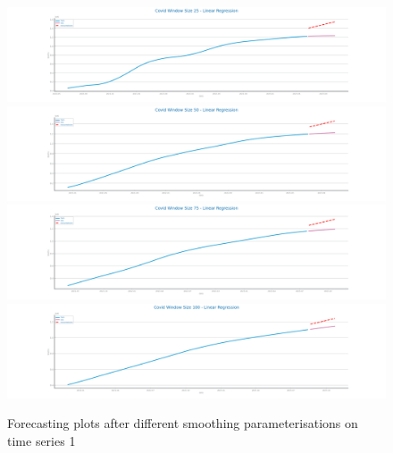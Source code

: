 \documentclass[10pt]{extarticle}
\begin{document}
\begin{figure}[H]
\centering\includegraphics[scale=0.4]{images/dataset1/time_series/Covid Window Size 25 - Linear Regression_forecasting_series.png}
\includegraphics[scale=0.4]{images/dataset1/time_series/Covid Window Size 50 - Linear Regression_forecasting_series.png}
\includegraphics[scale=0.4]{images/dataset1/time_series/Covid Window Size 75 - Linear Regression_forecasting_series.png}
\includegraphics[scale=0.4]{images/dataset1/time_series/Covid Window Size 100 - Linear Regression_forecasting_series.png}
\caption{Forecasting plots after different smoothing parameterisations on time series 1}
\end{figure}
\end{document}

